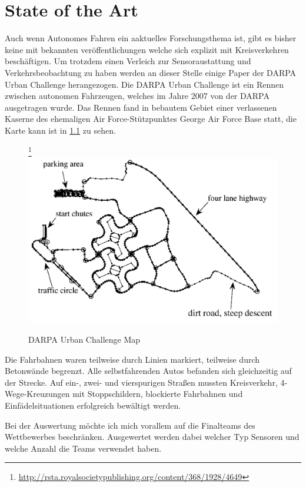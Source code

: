 \documentclass[11pt,oneside,openright]{mpreport}
\begin{document}
\chapter{State of the Art}
Auch wenn Autonomes Fahren ein aaktuelles Forschungsthema ist, gibt es bisher keine mit bekannten veröffentlichungen welche sich explizit mit Kreisverkehren beschäftigen.
Um trotzdem einen Verleich zur Sensoraustattung und Verkehrsbeobachtung zu haben werden an dieser Stelle einige Paper der \acs{DARPA} Urban Challenge herangezogen.
Die DARPA Urban Challenge ist ein Rennen zwischen autonomen Fahrzeugen, welches im Jahre 2007 von der \ac{DARPA} ausgetragen wurde. \cite{Buehler2010} Das Rennen fand in bebautem Gebiet
einer verlassenen Kaserne des ehemaligen Air Force-Stützpunktes George Air Force Base statt, die Karte kann ist in \cref{darpa_map} zu sehen.

\begin{figure}[!ht]
\caption{ \acs{DARPA} Urban Challenge Map }
\footnote{\url{http://rsta.royalsocietypublishing.org/content/368/1928/4649}}
\includegraphics[width=\textwidth]{bilder/darpa_map_bw.png}
\label{darpa_map}
\end{figure}

Die Fahrbahnen waren teilweise durch Linien markiert, teilweise durch Betonwände begrenzt. Alle selbstfahrenden Autos befanden sich gleichzeitig auf der Strecke. 
Auf ein-, zwei- und vierspurigen Straßen mussten Kreisverkehr, 4-Wege-Kreuzungen mit Stoppschildern, blockierte Fahrbahnen und Einfädelsituationen erfolgreich bewältigt werden.
 
Bei der Auswertung  möchte ich mich vorallem auf die Finalteams des Wettbewerbes beschränken. Ausgewertet werden dabei welcher Typ Sensoren und welche Anzahl die Teams verwendet haben.
\end{document}
